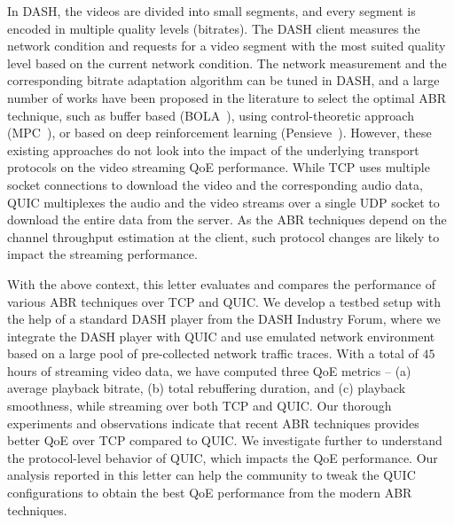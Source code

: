 In DASH, the videos are divided into small segments, and every segment is encoded in multiple quality levels (bitrates). The DASH client measures the network condition and requests for a video segment with the most suited quality level based on the current network condition. The network measurement and the corresponding bitrate adaptation algorithm can be tuned in DASH, and a large number of works have been proposed in the literature to select the optimal ABR technique, such as buffer based (BOLA~\cite{bola-2016}), using control-theoretic approach (MPC~\cite{yin2015control}), or based on deep reinforcement learning (Pensieve~\cite{mao2017neural}). However, these existing approaches do not look into the impact of the underlying transport protocols on the video streaming QoE performance. While TCP uses multiple socket connections to download the video and the corresponding audio data, QUIC multiplexes the audio and the video streams over a single UDP socket to download the entire data from the server. 
As the ABR techniques depend on the channel throughput estimation at the client, such protocol changes are likely to impact the streaming performance. 



With the above context, this letter evaluates and compares the performance of various ABR techniques over TCP and QUIC. We develop a testbed setup with the help of a standard DASH player from the DASH Industry Forum, where we integrate the DASH player with QUIC and use emulated network environment based on a large pool of pre-collected network traffic traces. 
With a total of $45$ hours of streaming video data, we have computed three QoE metrics -- (a) average playback bitrate, (b) total rebuffering duration, and (c) playback smoothness, while streaming over both TCP and QUIC. Our thorough experiments and observations indicate that recent ABR techniques provides better QoE over TCP compared to QUIC. We investigate further to understand the protocol-level behavior of QUIC, which impacts the QoE performance.
Our analysis reported in this letter can help the community to tweak the QUIC configurations to obtain the best QoE performance from the modern ABR techniques. 

